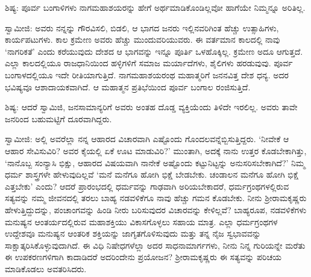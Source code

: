 ಶಿಷ್ಯ: ಪೂರ್ವ ಬಂಗಾಳಿಗಳು ನಾಗಮಹಾಶಯರನ್ನು ಹೇಗೆ ಅರ್ಥಮಾಡಿಕೊಂಡಿಲ್ಲವೋ ಹಾಗೆಯೇ ನಿಮ್ಮನ್ನೂ ಅರಿತಿಲ್ಲ.

ಸ್ವಾಮೀಜಿ: ಅವರು ನನ್ನನ್ನು ಗೌರವಿಸಲಿ, ಬಿಡಲಿ, ಆ ಭಾಗದ ಜನರು ಇಲ್ಲಿನವರಿಗಿಂತ ಹೆಚ್ಚು ಉತ್ಸಾಹಿಗಳು, ಕಾರ್ಯಪಟುಗಳು. ಕಾಲ ಕ್ರಮೇಣ ಅವರು ಹೆಚ್ಚು ಮುಂದುವರಿಯುವರು. ಈ ವರ್ತಮಾನ ಕಾಲದಲ್ಲಿ ನಾವು ‘ನಾಗರಿಕತೆ’ ಎಂದು ಕರೆಯುವುದು ದೇಶದ ಆ ಭಾಗವನ್ನು ಇನ್ನೂ ಪೂರ್ತಿ ಒಳಹೊಕ್ಕಿಲ್ಲ. ಕ್ರಮೇಣ ಅದೂ ಆಗುತ್ತದೆ. ಎಲ್ಲಾ ಕಾಲದಲ್ಲಿಯೂ ರಾಜಧಾನಿಯಿಂದ ಹಳ್ಳಿಗಳಿಗೆ ಸಮಾಜ ಮರ್ಯಾದೆಗಳು, ಶೈಲಿಗಳು ಹರಡುವುವು. ಪೂರ್ವ ಬಂಗಾಳದಲ್ಲಿಯೂ ಇದೇ ರೀತಿಯಾಗುತ್ತಿದೆ. ನಾಗಮಹಾಶಯರಂಥ ಮಹಾತ್ಮರಿಗೆ ಜನನವಿತ್ತ ದೇಶ ಧನ್ಯ. ಅದರ ಭವಿಷ್ಯವೂ ಆಶಾದಾಯಕವಾಗಿದೆ. ಆ ಮಹಾತ್ಮನ ಪ್ರತಿಭೆಯಿಂದ ಪೂರ್ವ ಬಂಗಾಲ ರಂಜಿಸುತ್ತಿದೆ.

ಶಿಷ್ಯ: ಆದರೆ ಸ್ವಾಮಿಜಿ, ಜನಸಾಮಾನ್ಯರಿಗೆ ಅವರು ಅಂತಹ ದೊಡ್ಡ ವ್ಯಕ್ತಿಯೆಂದು ತಿಳಿದೇ ಇರಲಿಲ್ಲ. ಅವರು ತಾವೇ ಜನರಿಂದ ಬಹುಮಟ್ಟಿಗೆ ದೂರವಾಗಿದ್ದರು.

ಸ್ವಾಮೀಜಿ: ಅಲ್ಲಿ ಅವರೆಲ್ಲಾ ನನ್ನ ಆಹಾರದ ವಿಚಾರವಾಗಿ ಎಷ್ಟೊಂದು ಗೊಂದಲವನ್ನೆಬ್ಬಿಸುತ್ತಿದ್ದರು. ‘ನೀವೇಕೆ ಆ ಆಹಾರ ಸೇವಿಸುವಿರಿ? ಅವರ ಕೈಯಲ್ಲಿ ಏಕೆ ಊಟ ಮಾಡುವಿರಿ?’ ಮುಂತಾಗಿ, ಅದಕ್ಕೆ ನಾನು ಉತ್ತರ ಕೊಡಬೇಕಾಗಿತ್ತು, ‘ನಾನೊಬ್ಬ ಸಂನ್ಯಾಸಿ ಭಿಕ್ಷು, ಆಹಾರದ ವಿಷಯವಾಗಿ ನಾನೇಕೆ ಅಷ್ಟೊಂದು ಕಟ್ಟುನಿಟ್ಟನ್ನು ಅನುಸರಿಸಬೇಕಾಗಿದೆ?’ ನಿಮ್ಮ ಧರ್ಮ ಶಾಸ್ತ್ರಗಳೇ ಹೇಳುವುದಿಲ್ಲವೆ ‘ಮನೆ ಮನೆಗೂ ಹೋಗಿ ಭಿಕ್ಷೆ ಬೇಡಬೇಕು. ಚಂಡಾಲನ ಮನೆಗೂ ಹೋಗಿ ಭಿಕ್ಷೆ ಎತ್ತಬೇಕು’ ಎಂದು? ಆದರೆ ಪ್ರಾರಂಭದಲ್ಲಿ ಧರ್ಮವನ್ನು ಗಾಢವಾಗಿ ಅರಿಯಬೇಕಾದರೆ, ಧರ್ಮಗ್ರಂಥಗಳಲ್ಲಿರುವ ಸತ್ಯವನ್ನು ನಮ್ಮ ಜೀವನದಲ್ಲಿ ತರಲು ಬಾಹ್ಯ ನಡವಳಿಕೆಗೂ ನಾವು ಹೆಚ್ಚು ಗಮನ ಕೊಡಬೇಕು. ನೀನು ಶ‍್ರೀರಾಮಕೃಷ್ಣರು ಹೇಳುತ್ತಿದ್ದುದನ್ನು, ಪಂಚಾಂಗವನ್ನು ಹಿಂಡಿ ನೀರು ಬರಿಸುವುದರ ವಿಚಾರವನ್ನು ಕೇಳಿಲ್ಲವೆ? ಬಾಹ್ಯರೂಪ, ನಡವಳಿಕೆಗಳು ಮನುಷ್ಯನ ಆಂತರ್ಯದಲ್ಲಿರುವ ಮಹಾಶಕ್ತಿಯು ವಿಕಾಸಗೊಳ್ಳಲು ಸಹಾಯ ಮಾತ್ರ. ಎಲ್ಲಾ ಧರ್ಮಗ್ರಂಥಗಳ ಉದ್ದೇಶವೂ ಮನುಷ್ಯನ ಆಂತರಿಕ ಶಕ್ತಿಯನ್ನು ಜಾಗೃತಗೊಳಿಸುವುದು ಮತ್ತು ತನ್ನ ನೈಜ ಸ್ವಭಾವವನ್ನು ಸಾಕ್ಷಾತ್ಕರಿಸಿಕೊಳ್ಳುವುದಾಗಿದೆ. ಈ ವಿಧಿ ನಿಷೇಧಗಳೆಲ್ಲಾ ಅದರ ಸಾಧನಾಮಾರ್ಗಗಳು, ನೀನು ನಿನ್ನ ಗುರಿಯನ್ನೇ ಮರೆತು ಈ ಉಪಕರಣಗಳಿಗಾಗಿ ಕಾದಾಡಿದರೆ ಅದರಿಂದೇನು ಪ್ರಯೋಜನ? ಶ‍್ರೀರಾಮಕೃಷ್ಣರು ಈ ಸತ್ಯವನ್ನು ಪರಿಚಯ ಮಾಡಿಕೊಡಲು ಅವತರಿಸಿದರು.

